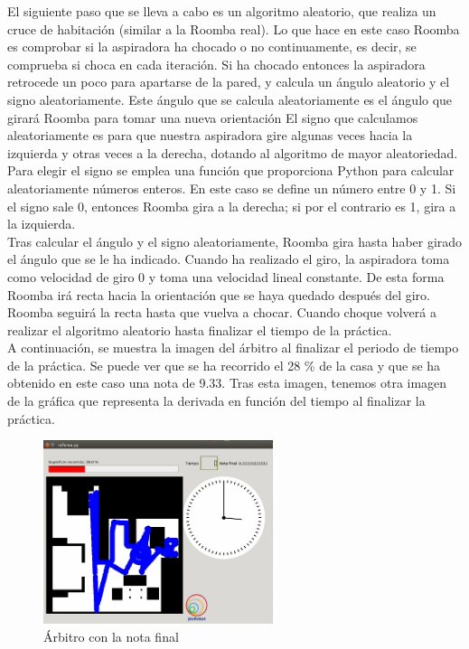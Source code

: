 El siguiente paso que se lleva a cabo es un algoritmo aleatorio, que realiza un cruce de habitación (similar a la Roomba real). Lo que hace en este caso Roomba es comprobar si la aspiradora ha chocado o no continuamente, es decir, se comprueba si choca en cada iteración. Si ha chocado entonces la aspiradora retrocede un poco para apartarse de la pared, y calcula un ángulo aleatorio y el signo aleatoriamente. Este ángulo que se calcula aleatoriamente es el ángulo que girará Roomba para tomar una nueva orientación El signo que calculamos aleatoriamente es para que nuestra aspiradora gire algunas veces hacia la izquierda y otras veces a la derecha, dotando al algoritmo de mayor aleatoriedad. Para elegir el signo se emplea una función que proporciona Python para calcular aleatoriamente números enteros. En este caso se define un número entre 0 y 1. Si el signo sale 0, entonces Roomba gira a la derecha; si por el contrario es 1, gira a la izquierda.\\

Tras calcular el ángulo y el signo aleatoriamente, Roomba gira hasta haber girado el ángulo que se le ha indicado. Cuando ha realizado el giro, la aspiradora toma como velocidad de giro 0 y toma una velocidad lineal constante. De esta forma Roomba irá recta hacia la orientación que se haya quedado después del giro. Roomba seguirá la recta hasta que vuelva a chocar. Cuando choque volverá a realizar el algoritmo aleatorio hasta finalizar el tiempo de la práctica.\\

A continuación, se muestra la imagen del árbitro al finalizar el periodo de tiempo de la práctica. Se puede ver que se ha recorrido el 28 \% de la casa y que se ha obtenido en este caso una nota de 9.33. Tras esta imagen, tenemos otra imagen de la gráfica que representa la derivada en función del tiempo al finalizar la práctica.\\


\begin{figure}[H]
  \begin{center}
    \includegraphics[width=0.6\textwidth]{figures/Vacuum/Referee_Roomba.png}
		\caption{Árbitro con la nota final}
		\label{fig.Referee_Roomba}
		\end{center}
\end{figure}

